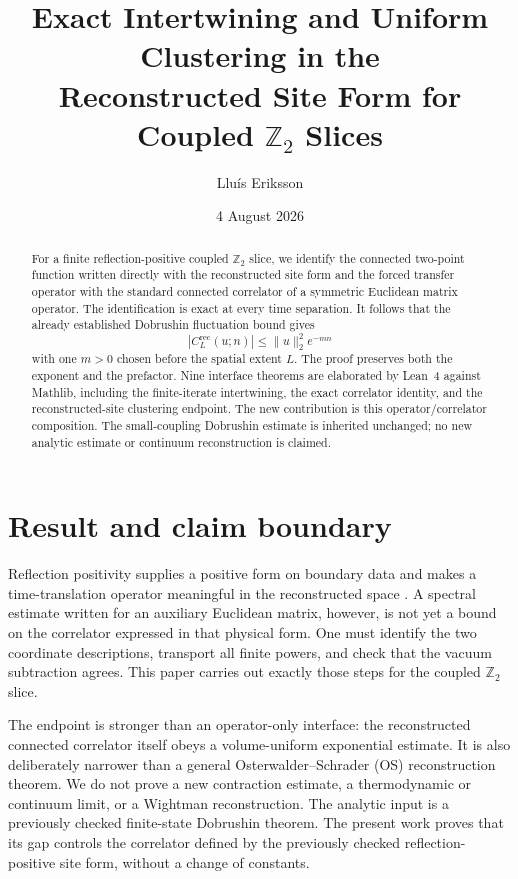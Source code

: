 \documentclass[11pt]{article}
\title{Exact Intertwining and Uniform Clustering in the\\
Reconstructed Site Form for Coupled $\mathbb Z_2$ Slices}
\author{Llu\'is Eriksson}
\date{4 August 2026}
\begin{document}
\maketitle

\begin{abstract}
For a finite reflection-positive coupled $\mathbb Z_2$ slice, we identify the
connected two-point function written directly with the reconstructed site form
and the forced transfer operator with the standard connected correlator of a
symmetric Euclidean matrix operator.  The identification is exact at every
time separation.  It follows that the already established Dobrushin
fluctuation bound gives
\[
  |C^{\mathrm{rec}}_L(u;n)|\leq \|u\|_2^2 e^{-mn}
\]
with one $m>0$ chosen before the spatial extent $L$.  The proof preserves both
the exponent and the prefactor.  Nine interface theorems are elaborated by
Lean~4 against Mathlib, including the finite-iterate intertwining, the exact
correlator identity, and the reconstructed-site clustering endpoint.  The new
contribution is this operator/correlator composition.  The small-coupling
Dobrushin estimate is inherited unchanged; no new analytic estimate or
continuum reconstruction is claimed.
\end{abstract}

\section{Result and claim boundary}

Reflection positivity supplies a positive form on boundary data and makes a
time-translation operator meaningful in the reconstructed space
\cite{OS1,OS2,OsterwalderSeiler}.  A spectral estimate written for an auxiliary
Euclidean matrix, however, is not yet a bound on the correlator expressed in
that physical form.  One must identify the two coordinate descriptions,
transport all finite powers, and check that the vacuum subtraction agrees.
This paper carries out exactly those steps for the coupled $\mathbb Z_2$ slice.

The endpoint is stronger than an operator-only interface: the reconstructed
connected correlator itself obeys a volume-uniform exponential estimate.  It
is also deliberately narrower than a general Osterwalder--Schrader (OS)
reconstruction theorem.  We do not prove a new contraction estimate, a
thermodynamic or continuum limit, or a Wightman reconstruction.  The analytic
input is a previously checked finite-state Dobrushin theorem.  The present
work proves that its gap controls the correlator defined by the previously
checked reflection-positive site form, without a change of constants.
\end{document}
